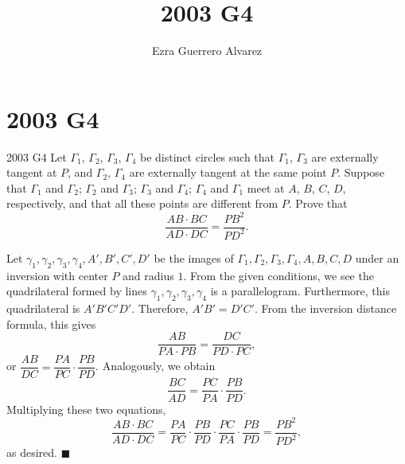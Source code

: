 \documentclass[14pt]{article}
\title{2003 G4}
\author{Ezra Guerrero Alvarez}
\begin{document}
\maketitle
	
\section*{2003 G4}

\begin{statement}{2003 G4}
	Let $\Gamma_1$, $\Gamma_2$, $\Gamma_3$, $\Gamma_4$ be distinct circles such that $\Gamma_1$, $\Gamma_3$ are externally tangent at $P$, and $\Gamma_2$, $\Gamma_4$ are externally tangent at the same point $P$. Suppose that $\Gamma_1$ and $\Gamma_2$; $\Gamma_2$ and $\Gamma_3$; $\Gamma_3$ and $\Gamma_4$; $\Gamma_4$ and $\Gamma_1$ meet at $A$, $B$, $C$, $D$, respectively, and that all these points are different from $P$. Prove that
	\[ \frac{AB\cdot BC}{AD\cdot DC}=\frac{PB^2}{PD^2}. \]
\end{statement}
Let $\gamma_1,\gamma_2,\gamma_3,\gamma_4,A',B',C',D'$ be the images of $\Gamma_1,\Gamma_2,\Gamma_3,\Gamma_4,A,B,C,D$ under an inversion with center $P$ and radius $1$. From the given conditions, we see the quadrilateral formed by lines $\gamma_1,\gamma_2,\gamma_3,\gamma_4$ is a parallelogram. Furthermore, this quadrilateral is $A'B'C'D'$. Therefore, $A'B'=D'C'$. From the inversion distance formula, this gives
\[ \frac{AB}{PA\cdot PB}=\frac{DC}{PD\cdot PC}, \]
or $\dfrac{AB}{DC}=\dfrac{PA}{PC}\cdot\dfrac{PB}{PD}$. Analogously, we obtain
\[ \frac{BC}{AD}=\frac{PC}{PA}\cdot\frac{PB}{PD}. \]
Multiplying these two equations,
\[ \frac{AB\cdot BC}{AD\cdot DC}=\frac{PA}{PC}\cdot\frac{PB}{PD}\cdot\frac{PC}{PA}\cdot\frac{PB}{PD}=\frac{PB^2}{PD^2}, \]
as desired. $\blacksquare$
	
\end{document}
